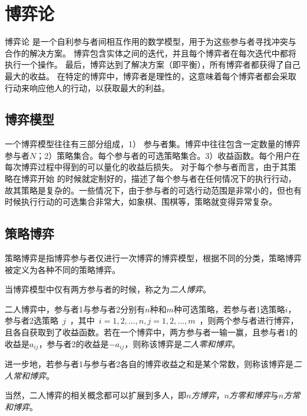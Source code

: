 \section{博弈论}
博弈论\cite{owen2001game,gibbons1992game} 是一个自利参与者间相互作用的数学模型，用于为这些参与者寻找冲突与合作的解决方案。 博弈包含实体之间的迭代，并且每个博弈者在每次迭代中都将执行一个操作。 最后，博弈达到了解决方案（即平衡），所有博弈者都获得了自己最大的收益。 在特定的博弈中，博弈者是理性的，这意味着每个博弈者都会采取行动来响应他人的行动，以获取最大的利益。


\subsection{博弈模型}

一个博弈模型往往有三部分组成，1） 参与者集。博弈中往往包含一定数量的博弈参与者$N$；2）策略集合。每个参与者的可选策略集合。3）收益函数。每个用户在每次博弈过程中得到的可以量化的收益后损失。
对于每个参与者而言，由于其策略在博弈开始 的时候就定制好的，描述了每个参与者在任何情况下的执行行动，故其策略是复杂的。一些情况下，由于参与者的可选行动范围是非常小的，但也有时候执行行动的可选集合非常大，如象棋、围棋等，策略就变得异常复杂。

\subsection{策略博弈}
策略博弈是指博弈参与者仅进行一次博弈的博弈模型，根据不同的分类，策略博弈被定义为各种不同的策略博弈。
\begin{definition}
当博弈模型中仅有两方参与者的时候，称之为\textit{二人博弈}。
\end{definition}

\begin{definition}
二人博弈中，参与者1与参与者2分别有$n$种和$m$种可选策略，若参与者1选策略$i$，参与者2选策略~$j$~，其中~$i=1,2,...,n,j=1,2,...,m$~，则两个参与者进行博弈，且各自获取到了收益函数。若在一个博弈中，两方参与者一输一赢，且参与者1的收益是$a_{ij}$，参与者2的收益是$-a_{ij}$，则称该博弈是\textit{二人零和博弈}。
\end{definition}

\begin{definition}
	进一步地，若参与者1与参与者2各自的博弈收益之和是某个常数，则称该博弈是\textit{二人常和博弈}。
\end{definition}

当然，二人博弈的相关概念都可以扩展到多人，即\textit{$n$方博弈}，\textit{$n$方零和博弈}与\textit{$n$方常和博弈}。

